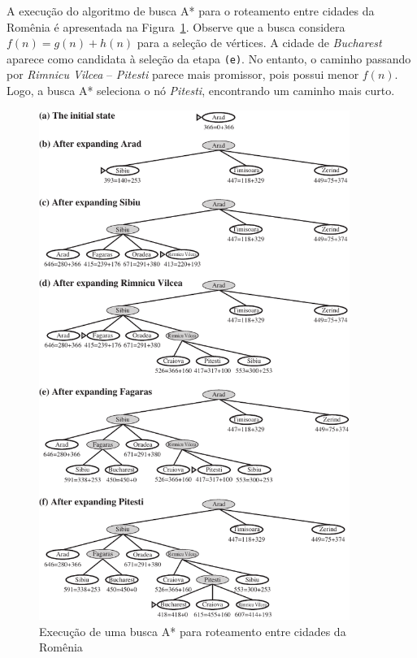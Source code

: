 A execução do algoritmo de busca A* para o roteamento entre cidades da Romênia é apresentada na Figura~\ref{fig:execucao-busca-a-estrela}. Observe que a busca considera $f(n) = g(n) + h(n)$ para a seleção de vértices. A cidade de \textit{Bucharest} aparece como candidata à seleção da etapa \texttt{(e)}. No entanto, o caminho passando por \textit{Rimnicu Vilcea} -- \textit{Pitesti} parece mais promissor, pois possui menor $f(n)$. Logo, a busca A* seleciona o nó \textit{Pitesti}, encontrando um caminho mais curto.

\begin{figure}[h]
	\centering
	\includegraphics[width=0.9\textwidth]{img/execucao-busca-a-estrela}
	\caption{Execução de uma busca A* para roteamento entre cidades da Romênia}
	\label{fig:execucao-busca-a-estrela}
\end{figure}

